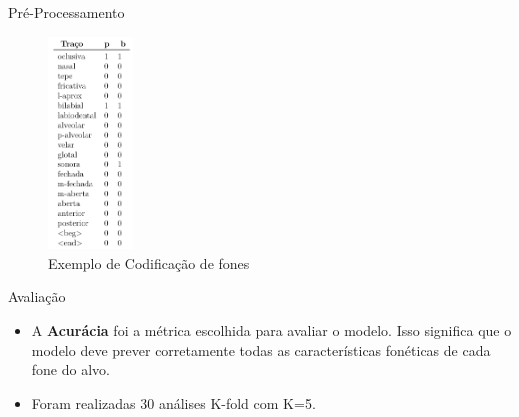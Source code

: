 \begin{frame}{Pré-Processamento}

\begin{figure}
    \centering
    \includegraphics[width=0.2\textwidth]{images/metodologia/features.png}
    \caption{Exemplo de Codificação de fones}
    \label{fig:features}
\end{figure}
    
\end{frame}

\begin{frame}{Avaliação}

\begin{itemize}
    \item<1->A \textbf{Acurácia} foi a métrica escolhida para avaliar o modelo. Isso significa que o modelo deve prever corretamente todas as características fonéticas de cada fone do alvo.
    \item<2->Foram realizadas 30 análises K-fold com K=5.
\end{itemize}
    
\end{frame}
